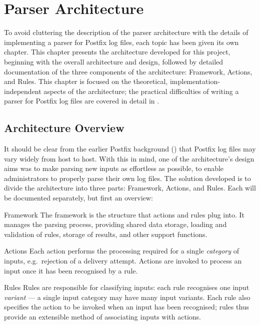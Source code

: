 \chapter{Parser Architecture}

\label{parser architecture}

To avoid cluttering the description of the parser architecture with the
details of implementing a parser for Postfix log files, each topic has been
given its own chapter.  This chapter presents the architecture developed
for this project, beginning with the overall architecture and design,
followed by detailed documentation of the three components of the
architecture: Framework, Actions, and Rules.  This chapter is focused on
the theoretical, implementation-independent aspects of the architecture;
the practical difficulties of writing a parser for Postfix log files are
covered in detail in .

\section{Architecture Overview}

\label{parser design}

It should be clear from the earlier Postfix background () that Postfix log files may vary widely from host to host.
With this in mind, one of the architecture's design aims was to make
parsing new inputs as effortless as possible, to enable administrators to
properly parse their own log files.  The solution developed is to divide
the architecture into three parts: Framework, Actions, and Rules.  Each
will be documented separately, but first an overview:

\begin{boldeqlist}

    \item [Framework]  The framework is the structure that actions and
        rules plug into.  It manages the parsing process, providing shared
        data storage, loading and validation of rules, storage of results,
        and other support functions.

    \item [Actions] Each action performs the processing required for a
        single \textit{category\/} of inputs, e.g.\ rejection of a delivery
        attempt.  Actions are invoked to process an input once it has been
        recognised by a rule.

    \item [Rules]  Rules are responsible for classifying inputs: each rule
        recognises one input \textit{variant\/} --- a single input category
        may have many input variants.  Each rule also specifies the action
        to be invoked when an input has been recognised; rules thus provide
        an extensible method of associating inputs with actions.

\end{boldeqlist}

